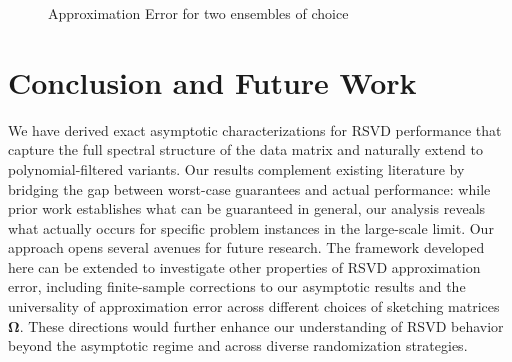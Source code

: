 \documentclass[conference]{IEEEtran}
\newcommand{\bOmega}{\bm{\Omega}}
\begin{document}
\begin{figure}[!h]
{{   
        } 
    }
    \caption{Approximation Error for two ensembles of choice}

\end{figure}

\section{Conclusion and Future Work}
We have derived exact asymptotic characterizations for RSVD performance that capture the full spectral structure of the data matrix and naturally extend to polynomial-filtered variants. Our results complement existing literature by bridging the gap between worst-case guarantees and actual performance: while prior work establishes what can be guaranteed in general, our analysis reveals what actually occurs for specific problem instances in the large-scale limit.
Our approach opens several avenues for future research. The framework developed here can be extended to investigate other properties of RSVD approximation error, including finite-sample corrections to our asymptotic results and the universality of approximation error across different choices of sketching matrices $\bOmega$. These directions would further enhance our understanding of RSVD behavior beyond the asymptotic regime and across diverse randomization strategies.
\end{document}
